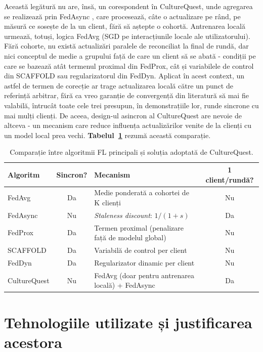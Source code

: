 \documentclass[12pt,a4paper]{report}
\begin{document}
Această legătură nu are, însă, un corespondent în CultureQuest, unde agregarea se realizează prin FedAsync \cite{xie2019fedasync}, care procesează, câte o actualizare pe rând, pe măsură ce sosește de la un client, fără să aștepte o cohortă. Antrenarea locală urmează, totuși, logica FedAvg (SGD pe interacțiunile locale ale utilizatorului). Fără cohorte, nu există actualizări paralele de reconciliat la final de rundă, dar nici conceptul de medie a grupului față de care un client să se abată - condiții pe care se bazează atât termenul proximal din FedProx, cât și variabilele de control din SCAFFOLD sau regularizatorul din FedDyn. Aplicat în acest context, un astfel de termen de corecție ar trage actualizarea locală către un punct de referință arbitrar, fără ca vreo garanție de convergență din literatură să mai fie valabilă, întrucât toate cele trei presupun, în demonstrațiile lor, runde sincrone cu mai mulți clienți. De aceea, design-ul asincron al CultureQuest are nevoie de altceva - un mecanism care reduce influența actualizărilor venite de la clienți cu un model local prea vechi. \textbf{Tabelul~\ref{tab:fl-alternative}} rezumă această comparație.

\begin{table}[h]
\centering
\footnotesize
\caption{Comparație între algoritmii FL principali și soluția adoptată de CultureQuest.}
\label{tab:fl-alternative}
\begin{tabular}{|l|c|p{5.5cm}|c|}
\hline
\textbf{Algoritm} & \textbf{Sincron?} & \textbf{Mecanism} & \textbf{1 client/rundă?} \\
\hline
FedAvg \cite{mcmahan2017fedavg} & Da & Medie ponderată a cohortei de K clienți & Nu \\
\hline
FedAsync \cite{xie2019fedasync} & Nu & \textit{Staleness discount}: $1/(1+s)$ & Da \\
\hline
FedProx \cite{li2020fedprox} & Da & Termen proximal (penalizare față de modelul global) & Nu \\
\hline
SCAFFOLD \cite{karimireddy2020scaffold} & Da & Variabilă de control per client & Nu \\
\hline
FedDyn \cite{acar2021feddyn} & Da & Regularizator dinamic per client & Nu \\
\hline
CultureQuest & Nu & FedAvg (doar pentru antrenarea locală) + FedAsync & Da \\
\hline
\end{tabular}
\end{table}

\section{Tehnologiile utilizate și justificarea acestora}
\end{document}
